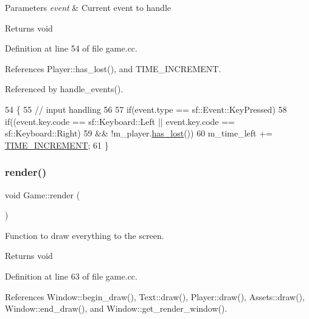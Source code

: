 \begin{DoxyParams}{Parameters}
{\em event} & Current event to handle \\
\hline
\end{DoxyParams}
\begin{DoxyReturn}{Returns}
void 
\end{DoxyReturn}


Definition at line 54 of file game.\+cc.



References Player\+::has\+\_\+lost(), and T\+I\+M\+E\+\_\+\+I\+N\+C\+R\+E\+M\+E\+NT.



Referenced by handle\+\_\+events().


\begin{DoxyCode}
54                                      \{
55     \textcolor{comment}{// input handling}
56 
57     \textcolor{keywordflow}{if}(event.type == sf::Event::KeyPressed)
58         \textcolor{keywordflow}{if}((event.key.code == sf::Keyboard::Left || event.key.code == sf::Keyboard::Right)
59            && !m\_player.\hyperlink{class_player_a734ead9fd1aa89c2574310425da18dc7}{has\_lost}())
60             m\_time\_left += \hyperlink{game_8h_ad29ebde3c8bd7568e2e1e7d32bf7a3f3}{TIME\_INCREMENT};
61 \}
\end{DoxyCode}
\mbox{\label{class_game_a15ddd769261d923827a3cdf41499c843}} 
\subsubsection{\texorpdfstring{render()}{render()}}
{\footnotesize\ttfamily void Game\+::render (\begin{DoxyParamCaption}{ }\end{DoxyParamCaption})}



Function to draw everything to the screen. 

\begin{DoxyReturn}{Returns}
void 
\end{DoxyReturn}


Definition at line 63 of file game.\+cc.



References Window\+::begin\+\_\+draw(), Text\+::draw(), Player\+::draw(), Assets\+::draw(), Window\+::end\+\_\+draw(), and Window\+::get\+\_\+render\+\_\+window().



